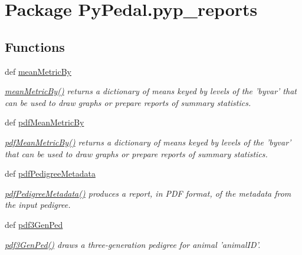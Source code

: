 \hypertarget{namespacePyPedal_1_1pyp__reports}{
\section{Package Py\-Pedal.pyp\_\-reports}
\label{namespacePyPedal_1_1pyp__reports}
}


\subsection*{Functions}
\begin{CompactItemize}
\item 
def \hyperlink{namespacePyPedal_1_1pyp__reports_bdef097ff294848a2a497f5c1dfef623}{mean\-Metric\-By}
\begin{CompactList}\small\item\em \hyperlink{namespacePyPedal_1_1pyp__reports_bdef097ff294848a2a497f5c1dfef623}{mean\-Metric\-By()} returns a dictionary of means keyed by levels of the 'byvar' that can be used to draw graphs or prepare reports of summary statistics. \item\end{CompactList}\item 
def \hyperlink{namespacePyPedal_1_1pyp__reports_ec86116b871dbe57b254cd10bd92fc8a}{pdf\-Mean\-Metric\-By}
\begin{CompactList}\small\item\em \hyperlink{namespacePyPedal_1_1pyp__reports_ec86116b871dbe57b254cd10bd92fc8a}{pdf\-Mean\-Metric\-By()} returns a dictionary of means keyed by levels of the 'byvar' that can be used to draw graphs or prepare reports of summary statistics. \item\end{CompactList}\item 
def \hyperlink{namespacePyPedal_1_1pyp__reports_11a744e9a637f073c0457573fa82bd0c}{pdf\-Pedigree\-Metadata}
\begin{CompactList}\small\item\em \hyperlink{namespacePyPedal_1_1pyp__reports_11a744e9a637f073c0457573fa82bd0c}{pdf\-Pedigree\-Metadata()} produces a report, in PDF format, of the metadata from the input pedigree. \item\end{CompactList}\item 
def \hyperlink{namespacePyPedal_1_1pyp__reports_d6ab6b0b0f5c79b36a1c97842bb552d4}{pdf3Gen\-Ped}
\begin{CompactList}\small\item\em \hyperlink{namespacePyPedal_1_1pyp__reports_d6ab6b0b0f5c79b36a1c97842bb552d4}{pdf3Gen\-Ped()} draws a three-generation pedigree for animal 'animal\-ID'. \item\end{CompactList}\end{CompactItemize}


